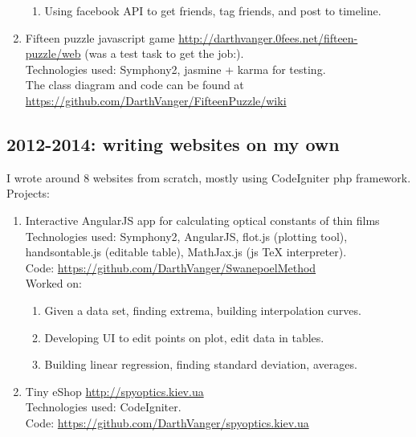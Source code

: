 \documentclass[a4paper, 14pt]{article}
\begin{document}
\begin{enumerate}
\begin{enumerate}
                \item Using facebook API to get friends, tag friends, and post to timeline.
            \end{enumerate}
        \item Fifteen puzzle javascript game \url{http://darthvanger.0fees.net/fifteen-puzzle/web} (was a test task to get the job:). \\
            Technologies used: Symphony2, jasmine + karma for testing. \\
            The class diagram and code can be found at \\
            \url{https://github.com/DarthVanger/FifteenPuzzle/wiki}
    \end{enumerate}

	\subsection{2012-2014: writing websites on my own}
	I wrote around 8 websites from scratch, mostly using CodeIgniter php framework. \\
    Projects:
        \begin{enumerate}
            \item Interactive AngularJS app for calculating optical constants of thin films \\
            Technologies used: Symphony2, AngularJS, flot.js (plotting tool), handsontable.js (editable table), MathJax.js (js TeX interpreter). \\
            Code: \url{https://github.com/DarthVanger/SwanepoelMethod} \\
            Worked on:
            \begin{enumerate}
                \item Given a data set, finding extrema, building interpolation curves.
                \item Developing UI to edit points on plot, edit data in tables.
                \item Building linear regression, finding standard deviation, averages.
            \end{enumerate}

            \item Tiny eShop \url{http://spyoptics.kiev.ua} \\
            Technologies used: CodeIgniter. \\
            Code: \url{https://github.com/DarthVanger/spyoptics.kiev.ua}
        \end{enumerate}
\end{document}
